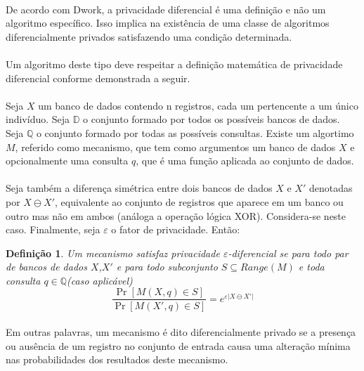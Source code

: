 \paragraph{} De acordo com Dwork\cite{dwork2008differential}, a privacidade diferencial é uma definição e não um algoritmo específico. Isso implica na existência de uma classe de algoritmos diferencialmente privados satisfazendo uma condição determinada.

\paragraph{} Um algoritmo deste tipo deve respeitar a definição matemática de privacidade diferencial\cite{dwork2011differential} conforme demonstrada a seguir.

\paragraph{} Seja $X$ um banco de dados contendo n registros, cada um pertencente a um único indivíduo. 
Seja $\mathbb{D}$ o conjunto formado por todos os possíveis bancos de dados. 
Seja $\mathbb{Q}$ o conjunto formado por todas as possíveis consultas. Existe um algortimo $M$, referido como mecanismo, que tem como argumentos um banco de dados $X$ e opcionalmente uma consulta $q$, que é uma função aplicada ao conjunto de dados.

\paragraph{} Seja também a diferença simétrica entre dois bancos de dados $X$ e $X'$ denotadas por $X \ominus X'$, equivalente ao conjunto de registros que aparece em um banco ou outro mas não em ambos (análoga a operação lógica XOR). Considera-se neste caso. Finalmente, seja $\varepsilon$ o fator de privacidade. Então:

\newtheorem{definition}{Definição}
\begin{definition}\cite{dwork2011differential}
     Um mecanismo satisfaz privacidade $\varepsilon$-diferencial se para todo par de bancos de dados $X$,$X'$ e para todo subconjunto $S \subseteq Range(M)$ e toda consulta $q \in \mathbb{Q}$(caso aplicável)
     \[ \frac{\Pr \left[M\left(X,q\right)  \in  S \right]}{\Pr \left[M\left(X',q\right)  \in  S \right]} = e^{\varepsilon\vert X \ominus X' \vert }\]
\end{definition}

\paragraph{} Em outras palavras, um mecanismo é dito diferencialmente privado se a presença ou ausência de um registro no conjunto de entrada causa uma alteração mínima nas probabilidades dos resultados deste mecanismo.

